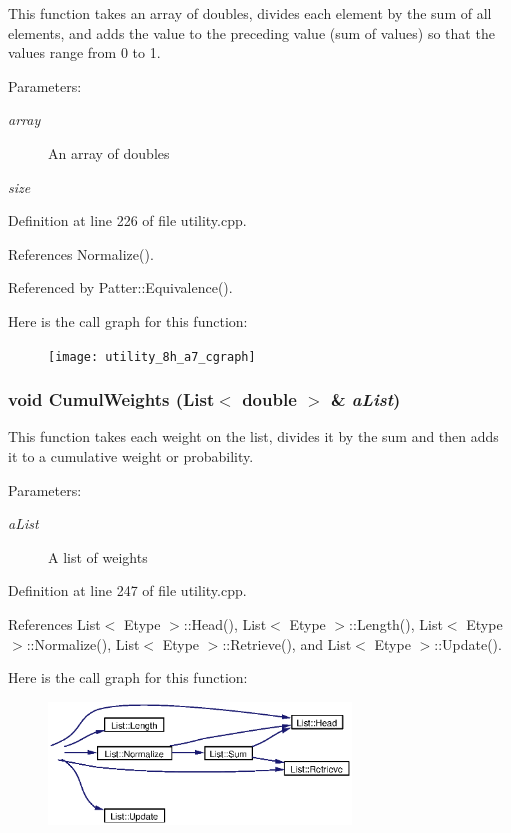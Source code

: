 This function takes an array of doubles, divides each element by the sum of all elements, and adds the value to the preceding value (sum of values) so that the values range from 0 to 1. \begin{Desc}
\item[Parameters:]
\begin{description}
\item[{\em array}]An array of doubles \item[{\em size}]\end{description}
\end{Desc}


Definition at line 226 of file utility.cpp.

References Normalize().

Referenced by Patter::Equivalence().

Here is the call graph for this function:\begin{figure}[H]
\begin{center}
\leavevmode
\texttt{[image: utility\_8h\_a7\_cgraph]}
\end{center}
\end{figure}
\subsubsection{\setlength{\rightskip}{0pt plus 5cm}void Cumul\-Weights ({\bf List}$<$ double $>$ \& {\em a\-List})}\label{utility_8h_a8}


This function takes each weight on the list, divides it by the sum and then adds it to a cumulative weight or probability. \begin{Desc}
\item[Parameters:]
\begin{description}
\item[{\em a\-List}]A list of weights \end{description}
\end{Desc}


Definition at line 247 of file utility.cpp.

References List$<$ Etype $>$::Head(), List$<$ Etype $>$::Length(), List$<$ Etype $>$::Normalize(), List$<$ Etype $>$::Retrieve(), and List$<$ Etype $>$::Update().

Here is the call graph for this function:\begin{figure}[H]
\begin{center}
\leavevmode
\includegraphics[width=228pt]{utility_8h_a8_cgraph}
\end{center}
\end{figure}
